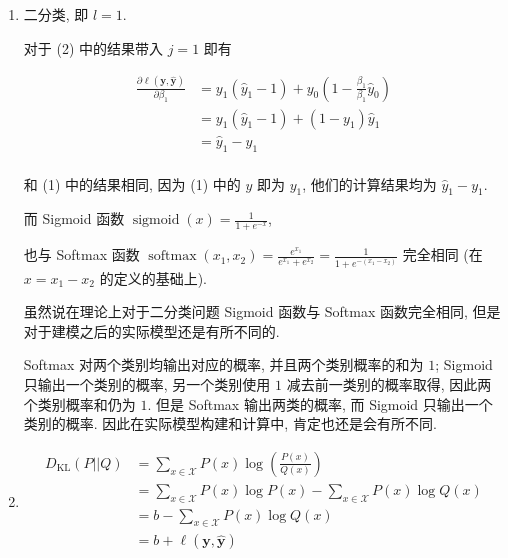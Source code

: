 \documentclass[answers]{exam}  %
\begin{document}
\begin{questions}
\begin{solution}
\begin{enumerate}
      \item

            二分类, 即 $l = 1$.

            对于 (2) 中的结果带入 $j = 1$ 即有

            $$
              \begin{aligned}
                \frac{\partial \ell(\bm{y}, \hat{\bm{y}})}{\partial \beta_1}
                 & = y_1(\hat{y}_1 - 1) + y_0(1 - \frac{\beta_1}{\beta_1}\hat{y}_0) \\
                 & = y_1(\hat{y}_1 - 1) + (1 - y_1)\hat{y}_1                        \\
                 & = \hat{y}_1 - y_{1}                                              \\
              \end{aligned}
            $$

            和 (1) 中的结果相同, 因为 (1) 中的 $y$ 即为 $y_1$, 他们的计算结果均为 $\hat{y}_1 - y_1$.

            而 Sigmoid 函数 $\displaystyle \operatorname{sigmoid}(x) = \frac{1}{1 + e^{-x}}$,

            也与 Softmax 函数 $\displaystyle \operatorname{softmax}(x_1, x_2) = \frac{e^{x_1}}{e^{x_1} + e^{x_2}} = \frac{1}{1 + e^{-(x_1-x_2)}}$ 完全相同 (在 $x = x_1 - x_2$ 的定义的基础上).

            虽然说在理论上对于二分类问题 Sigmoid 函数与 Softmax 函数完全相同, 但是对于建模之后的实际模型还是有所不同的.

            Softmax 对两个类别均输出对应的概率, 并且两个类别概率的和为 $1$; Sigmoid 只输出一个类别的概率, 另一个类别使用 $1$ 减去前一类别的概率取得, 因此两个类别概率和仍为 $1$. 但是 Softmax 输出两类的概率, 而 Sigmoid 只输出一个类别的概率. 因此在实际模型构建和计算中, 肯定也还是会有所不同.

      \item

            $$
              \begin{aligned}
                \displaystyle D_{\mathrm{KL}}(P || Q) & = \sum_{x \in \mathcal{X}}P(x)\log(\frac{P(x)}{Q(x)})                           \\
                                                      & = \sum_{x \in \mathcal{X}}P(x)\log P(x) - \sum_{x \in \mathcal{X}}P(x)\log Q(x) \\
                                                      & = b - \sum_{x \in \mathcal{X}}P(x)\log Q(x)                                     \\
                                                      & = b + \ell(\bm{y}, \hat{\bm{y}})                                                \\
              \end{aligned}
            $$


\end{enumerate}
\end{solution}
\end{questions}
\end{document}
